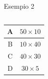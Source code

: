\begin{frame}{Esempio 2}

\vspace{-6pt}
\begin{columns}[T]
\begingroup
\setlength\arrayrulewidth{1pt}
\begin{tabular}{|c|c|}
\hline
A & $50 \times 10$ \\\hline
B & $10 \times 40$ \\\hline
C & $40 \times 30$ \\\hline
D & $30 \times 5$ \\\hline
\end{tabular}    
\endgroup
{}
\vspace{-16pt}    
\end{columns}

\end{frame}


